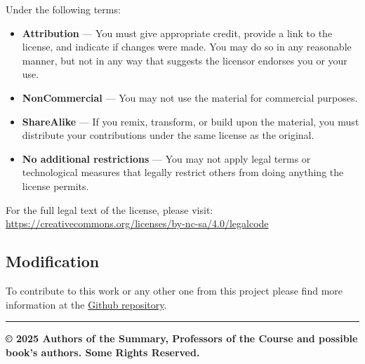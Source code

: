 \documentclass[
  a4paper,
  ,captions=tableheading
]{scrartcl}
\providecommand{\tightlist}{%
  \setlength{\itemsep}{0pt}\setlength{\parskip}{0pt}}
\begin{document}
Under the following terms:

\begin{itemize}
\tightlist
\item
  \textbf{Attribution} --- You must give appropriate credit, provide a
  link to the license, and indicate if changes were made. You may do so
  in any reasonable manner, but not in any way that suggests the
  licensor endorses you or your use.
\item
  \textbf{NonCommercial} --- You may not use the material for commercial
  purposes.
\item
  \textbf{ShareAlike} --- If you remix, transform, or build upon the
  material, you must distribute your contributions under the same
  license as the original.
\item
  \textbf{No additional restrictions} --- You may not apply legal terms
  or technological measures that legally restrict others from doing
  anything the license permits.
\end{itemize}

For the full legal text of the license, please visit:
\url{https://creativecommons.org/licenses/by-nc-sa/4.0/legalcode}

\subsection{Modification}\label{modification}

To contribute to this work or any other one from this project please
find more information at the
\href{https://github.com/Tfloow/Q8_KUL}{Github repository}.

\begin{center}\rule{0.5\linewidth}{0.5pt}\end{center}

\textbf{© 2025 Authors of the Summary, Professors of the Course and
possible book's authors. Some Rights Reserved.}
\end{document}
